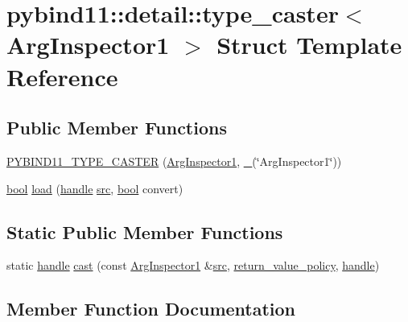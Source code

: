 \hypertarget{structpybind11_1_1detail_1_1type__caster_3_01_arg_inspector1_01_4}{}\section{pybind11\+::detail\+::type\+\_\+caster$<$ Arg\+Inspector1 $>$ Struct Template Reference}
\label{structpybind11_1_1detail_1_1type__caster_3_01_arg_inspector1_01_4}
\subsection*{Public Member Functions}
\begin{DoxyCompactItemize}
\item 
\mbox{\hyperlink{structpybind11_1_1detail_1_1type__caster_3_01_arg_inspector1_01_4_ab87e460f3cd3440a73ec682f68b0853c}{P\+Y\+B\+I\+N\+D11\+\_\+\+T\+Y\+P\+E\+\_\+\+C\+A\+S\+T\+ER}} (\mbox{\hyperlink{class_arg_inspector1}{Arg\+Inspector1}}, \mbox{\hyperlink{descr_8h_af114703e20c6527e87163eb2798f74b8}{\+\_\+}}(\char`\"{}Arg\+Inspector1\char`\"{}))
\item 
\mbox{\hyperlink{asdl_8h_af6a258d8f3ee5206d682d799316314b1}{bool}} \mbox{\hyperlink{structpybind11_1_1detail_1_1type__caster_3_01_arg_inspector1_01_4_a2703a99a5253784be42822bd4d4fd9d6}{load}} (\mbox{\hyperlink{classhandle}{handle}} \mbox{\hyperlink{_s_d_l__opengl__glext_8h_a72e0fdf0f845ded60b1fada9e9195cd7}{src}}, \mbox{\hyperlink{asdl_8h_af6a258d8f3ee5206d682d799316314b1}{bool}} convert)
\end{DoxyCompactItemize}
\subsection*{Static Public Member Functions}
\begin{DoxyCompactItemize}
\item 
static \mbox{\hyperlink{classhandle}{handle}} \mbox{\hyperlink{structpybind11_1_1detail_1_1type__caster_3_01_arg_inspector1_01_4_ad932ecc32a42f141a6896b92790391e8}{cast}} (const \mbox{\hyperlink{class_arg_inspector1}{Arg\+Inspector1}} \&\mbox{\hyperlink{_s_d_l__opengl__glext_8h_a72e0fdf0f845ded60b1fada9e9195cd7}{src}}, \mbox{\hyperlink{detail_2common_8h_adde72ab1fb0dd4b48a5232c349a53841}{return\+\_\+value\+\_\+policy}}, \mbox{\hyperlink{classhandle}{handle}})
\end{DoxyCompactItemize}


\subsection{Member Function Documentation}
\mbox{\label{structpybind11_1_1detail_1_1type__caster_3_01_arg_inspector1_01_4_ad932ecc32a42f141a6896b92790391e8}} 
